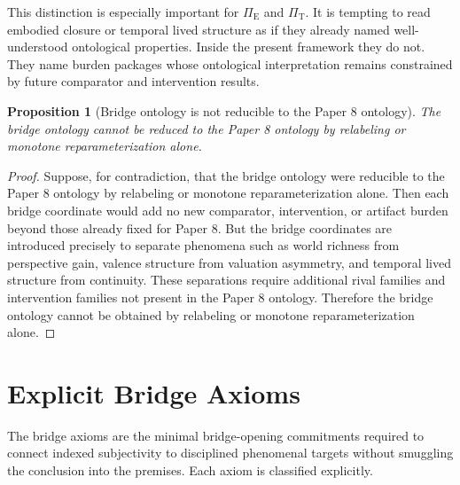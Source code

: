 \documentclass[11pt,a4paper]{article}
\newtheorem{proposition}[theorem]{Proposition}
\theoremstyle{definition}
\newcommand{\PiE}{\Pi_{\mathrm{E}}}
\newcommand{\PiT}{\Pi_{\mathrm{T}}}
\begin{document}
This distinction is especially important for $\PiE$ and $\PiT$. It is tempting to read embodied closure or temporal lived structure as if they already named well-understood ontological properties. Inside the present framework they do not. They name burden packages whose ontological interpretation remains constrained by future comparator and intervention results.

\begin{proposition}[Bridge ontology is not reducible to the Paper 8 ontology]
The bridge ontology cannot be reduced to the Paper 8 ontology by relabeling or monotone reparameterization alone.
\end{proposition}

\begin{proof}
Suppose, for contradiction, that the bridge ontology were reducible to the Paper 8 ontology by relabeling or monotone reparameterization alone. Then each bridge coordinate would add no new comparator, intervention, or artifact burden beyond those already fixed for Paper 8. But the bridge coordinates are introduced precisely to separate phenomena such as world richness from perspective gain, valence structure from valuation asymmetry, and temporal lived structure from continuity. These separations require additional rival families and intervention families not present in the Paper 8 ontology. Therefore the bridge ontology cannot be obtained by relabeling or monotone reparameterization alone.
\end{proof}

\section{Explicit Bridge Axioms}
The bridge axioms are the minimal bridge-opening commitments required to connect indexed subjectivity to disciplined phenomenal targets without smuggling the conclusion into the premises. Each axiom is classified explicitly.
\end{document}
